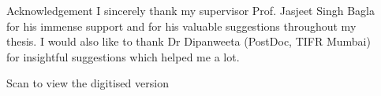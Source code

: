 \documentclass[final]{beamer}
\newlength{\sepwidth}
\newlength{\colwidth}
\newcommand{\separatorcolumn}{\begin{column}{\sepwidth}\end{column}}
\begin{document}
\begin{frame}[t]
\begin{columns}[t]
\begin{column}{\colwidth}
\begin{columns}[T]
\begin{column}{.48\textwidth}
\end{column}%
\end{columns}



  \begin{exampleblock}{Acknowledgement}
  I sincerely thank my supervisor Prof. Jasjeet Singh Bagla for his immense support and for his valuable suggestions throughout my thesis. I would also like to thank Dr Dipanweeta (PostDoc, TIFR Mumbai) for insightful suggestions which helped me a lot.

  \end{exampleblock}


  \begin{block}{Scan to view the digitised version}
    
    

  \end{block}

\end{column}
\separatorcolumn



\end{columns}
\end{frame}
\end{document}

